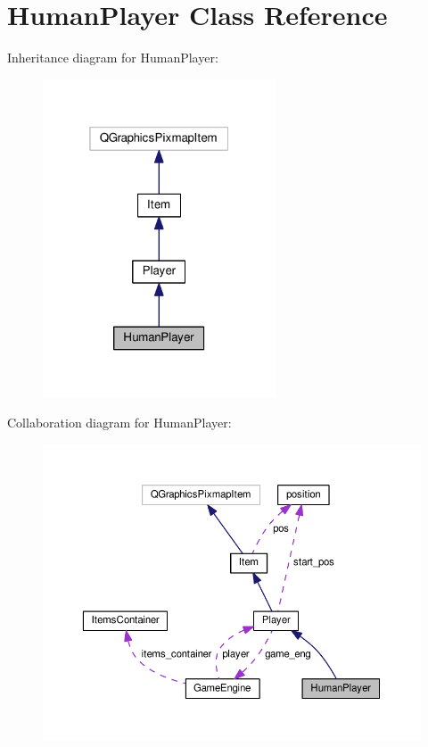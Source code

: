 \hypertarget{class_human_player}{}\section{Human\+Player Class Reference}
\label{class_human_player}


Inheritance diagram for Human\+Player\+:
\nopagebreak
\begin{figure}[H]
\begin{center}
\leavevmode
\includegraphics[width=196pt]{class_human_player__inherit__graph}
\end{center}
\end{figure}


Collaboration diagram for Human\+Player\+:
\nopagebreak
\begin{figure}[H]
\begin{center}
\leavevmode
\includegraphics[width=350pt]{class_human_player__coll__graph}
\end{center}
\end{figure}
